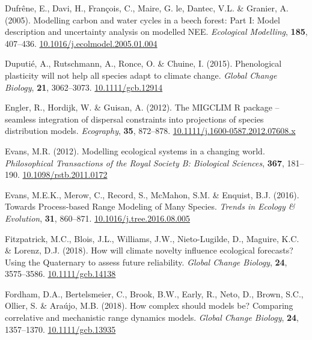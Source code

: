 \documentclass[11pt,]{article}
\newlength{\cslhangindent}
\newenvironment{CSLReferences}[2] %
 {%
  \setlength{\parindent}{0pt}
  \ifodd #1 \everypar{\setlength{\hangindent}{\cslhangindent}}\ignorespaces\fi
  \ifnum #2 > 0
  \setlength{\parskip}{#2\baselineskip}
  \fi
 }%
 {}
\begin{document}
\begin{CSLReferences}{1}{0}
\leavevmode{}%
Dufrêne, E., Davi, H., François, C., Maire, G. le, Dantec, V.L. \&
Granier, A. (2005). Modelling carbon and water cycles in a beech forest:
{Part} {I}: {Model} description and uncertainty analysis on modelled
{NEE}. \emph{Ecological Modelling}, \textbf{185}, 407--436.
\href{https://doi.org/10.1016/j.ecolmodel.2005.01.004}{10.1016/j.ecolmodel.2005.01.004}

\leavevmode{}%
Duputié, A., Rutschmann, A., Ronce, O. \& Chuine, I. (2015).
Phenological plasticity will not help all species adapt to climate
change. \emph{Global Change Biology}, \textbf{21}, 3062--3073.
\href{https://doi.org/10.1111/gcb.12914}{10.1111/gcb.12914}

\leavevmode{}%
Engler, R., Hordijk, W. \& Guisan, A. (2012). The {MIGCLIM} {R} package
-- seamless integration of dispersal constraints into projections of
species distribution models. \emph{Ecography}, \textbf{35}, 872--878.
\href{https://doi.org/10.1111/j.1600-0587.2012.07608.x}{10.1111/j.1600-0587.2012.07608.x}

\leavevmode{}%
Evans, M.R. (2012). Modelling ecological systems in a changing world.
\emph{Philosophical Transactions of the Royal Society B: Biological
Sciences}, \textbf{367}, 181--190.
\href{https://doi.org/10.1098/rstb.2011.0172}{10.1098/rstb.2011.0172}

\leavevmode{}%
Evans, M.E.K., Merow, C., Record, S., McMahon, S.M. \& Enquist, B.J.
(2016). Towards {Process}-based {Range} {Modeling} of {Many} {Species}.
\emph{Trends in Ecology \& Evolution}, \textbf{31}, 860--871.
\href{https://doi.org/10.1016/j.tree.2016.08.005}{10.1016/j.tree.2016.08.005}

\leavevmode{}%
Fitzpatrick, M.C., Blois, J.L., Williams, J.W., Nieto-Lugilde, D.,
Maguire, K.C. \& Lorenz, D.J. (2018). How will climate novelty influence
ecological forecasts? {Using} the {Quaternary} to assess future
reliability. \emph{Global Change Biology}, \textbf{24}, 3575--3586.
\href{https://doi.org/10.1111/gcb.14138}{10.1111/gcb.14138}

\leavevmode{}%
Fordham, D.A., Bertelsmeier, C., Brook, B.W., Early, R., Neto, D.,
Brown, S.C., Ollier, S. \& Araújo, M.B. (2018). How complex should
models be? {Comparing} correlative and mechanistic range dynamics
models. \emph{Global Change Biology}, \textbf{24}, 1357--1370.
\href{https://doi.org/10.1111/gcb.13935}{10.1111/gcb.13935}


\end{CSLReferences}
\end{document}
